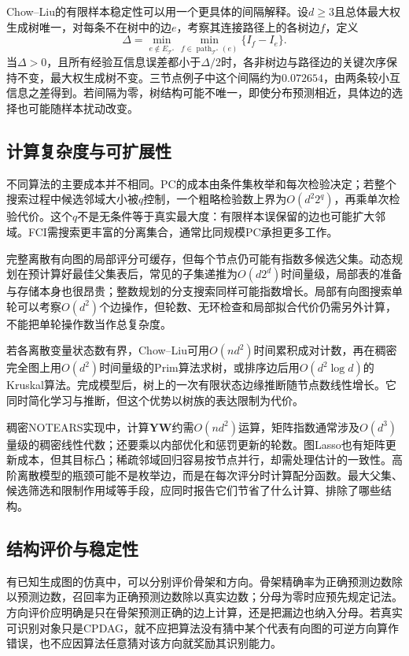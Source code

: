 Chow--Liu的有限样本稳定性可以用一个更具体的间隔解释。设$d\geq3$且总体最大权生成树唯一，对每条不在树中的边$e$，考察其连接路径上的各树边$f$，定义
\[
  \Delta=\min_{e\notin E_{\mathcal{T}^{*}}}
             \min_{f\in\operatorname{path}_{\mathcal{T}^{*}}(e)}
             \{I_f-I_e\}.
\]
当$\Delta>0$，且所有经验互信息误差都小于$\Delta/2$时，各非树边与路径边的关键次序保持不变，最大权生成树不变。三节点例子中这个间隔约为$0.072654$，由两条较小互信息之差得到。若间隔为零，树结构可能不唯一，即使分布预测相近，具体边的选择也可能随样本扰动改变。

\subsection{计算复杂度与可扩展性}
\label{sec:pgm-structure-learning-complexity}

不同算法的主要成本并不相同。PC的成本由条件集枚举和每次检验决定；若整个搜索过程中候选邻域大小被$q$控制，一个粗略检验数上界为$O(d^2 2^q)$，再乘单次检验代价。这个$q$不是无条件等于真实最大度：有限样本误保留的边也可能扩大邻域。FCI需搜索更丰富的分离集合，通常比同规模PC承担更多工作。

完整离散有向图的局部评分可缓存，但每个节点仍可能有指数多候选父集。动态规划在预计算好最佳父集表后，常见的子集递推为$O(d2^d)$时间量级，局部表的准备与存储本身也很昂贵；整数规划的分支搜索同样可能指数增长。局部有向图搜索单轮可以考察$O(d^2)$个边操作，但轮数、无环检查和局部拟合代价仍需另外计算，不能把单轮操作数当作总复杂度。

若各离散变量状态数有界，Chow--Liu可用$O(nd^2)$时间累积成对计数，再在稠密完全图上用$O(d^2)$时间量级的Prim算法求树，或排序边后用$O(d^2\log d)$的Kruskal算法。完成模型后，树上的一次有限状态边缘推断随节点数线性增长。它同时简化学习与推断，但这个优势以树族的表达限制为代价。

稠密NOTEARS实现中，计算$\bm{Y}\bm{W}$约需$O(nd^2)$运算，矩阵指数通常涉及$O(d^3)$量级的稠密线性代数；还要乘以内部优化和惩罚更新的轮数。图Lasso也有矩阵更新成本，但其目标凸；稀疏邻域回归容易按节点并行，却需处理估计的一致性。高阶离散模型的瓶颈可能不是枚举边，而是在每次评分时计算配分函数。最大父集、候选筛选和限制作用域等手段，应同时报告它们节省了什么计算、排除了哪些结构。

\subsection{结构评价与稳定性}
\label{sec:pgm-structure-learning-evaluation}

有已知生成图的仿真中，可以分别评价骨架和方向。骨架精确率为正确预测边数除以预测边数，召回率为正确预测边数除以真实边数；分母为零时应预先规定记法。方向评价应明确是只在骨架预测正确的边上计算，还是把漏边也纳入分母。若真实可识别对象只是CPDAG，就不应把算法没有猜中某个代表有向图的可逆方向算作错误，也不应因算法任意猜对该方向就奖励其识别能力。

